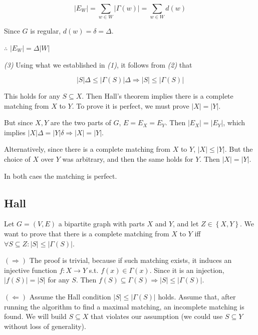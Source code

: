\documentclass[a4paper]{article}
\begin{document}
\begin{equation*}
    |E_W| = \sum_{w \in W} |\Gamma(w)| = \sum_{w \in W} d(w)
\end{equation*}

Since $G$ is regular, $d(w) = \delta = \Delta$. 

$\therefore $ $|E_W| = \Delta |W|$

\textit{(3)} Using what we established in \textit{(1)}, it follows from \textit{(2)} that

\begin{equation*}
    |S| \Delta \leq |\Gamma(S)| \Delta \Rightarrow |S| \leq |\Gamma(S)| 
\end{equation*}

This holds for any $S \subseteq X$. Then Hall's theorem implies there is a
complete matching from $X$ to $Y$. To prove it is perfect, we must prove $|X| =
|Y|$.

But since $X, Y$ are the two parts of $G$, $E = E_X = E_Y$. Then $|E_X| =
|E_Y|$, which implies $|X| \Delta = |Y| \delta \Rightarrow |X| =
|Y|$.

Alternatively, since there is a complete matching from $X$ to $Y$, $|X| \leq
|Y|$. But the choice of $X$ over $Y$ was arbitrary, and then the same holds for
$Y$. Then $|X| = |Y|$.

In both caes the matching is perfect.



\pagebreak 

\subsection{Hall}

Let $G = (V, E)$ a bipartite graph with parts $X$ and $Y$, and let $Z \in
\left\{ X, Y \right\} $. We want to prove that there is a complete matching
from $X$ to $Y$ iff $\forall S \subseteq Z : |S| \leq |\Gamma(S)| $.

$(\Rightarrow)$ The proof is trivial, because if such matching exists, it
induces an injective function $f : X \to Y$ s.t. $f(x) \in \Gamma(x)$. Since it
is an injection, $|f(S)| = |S|$ for any $S$. Then $f(S) \subseteq \Gamma(S)
\Rightarrow |S| \leq |\Gamma(S)|$.

$(\Leftarrow)$ Assume the Hall condition $|S| \leq |\Gamma(S)|$ holds. Assume
that, after running the algorithm to find a maximal matching, an incomplete
matching is found. We will build $S \subseteq X$ that violates our assumption
(we could use $S \subseteq Y$ without loss of generality).
\end{document}
